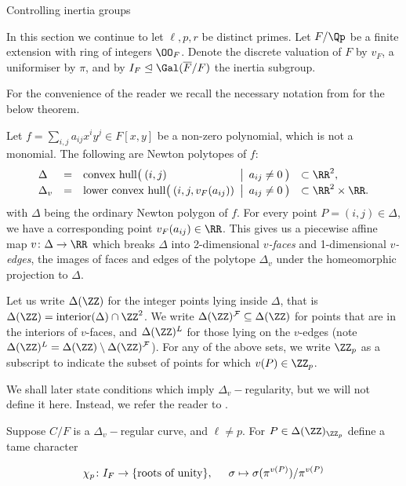 \documentclass[11pt,a4paper]{article}
\newcommand{\Dv}{\Delta_v}
\newcommand{\F}{\mathcal{F}}
\begin{document}
\begin{section}{Controlling inertia groups}
\label{section_inertia}

In this section we continue to let $\ell, p, r$ be distinct primes. Let $F/\Qp$ be a finite extension with ring of integers $\OO_F$.
Denote the discrete valuation of $F$ by $v_F$, a uniformiser by $\pi$, and by $I_F \trianglelefteq \Gal(\overline{F}/F)$ the inertia subgroup. 

For the convenience of the reader we recall the necessary notation from \cite{Models_Curves_DVR} for the below theorem.


Let $f = \sum_{i,j} a_{ij}x^iy^j \in F[x,y]$ be a non-zero polynomial, which is not a monomial.
The following are Newton polytopes of $f$:
$$
\begin{array}{lclrlll}
  \Delta & = & \text{convex hull}\bigl(\>  (i,j) &\bigm|\>a_{ij}\ne 0\>\bigr)  &\subset\RR^2,\\[2pt]
  \Dv    & = & \text{lower convex hull}\bigl(\>  (i,j,v_F(a_{ij}))\!\!\! &\bigm|\>a_{ij}\ne 0\>\bigr)  &\subset\RR^2\times\RR.
\end{array}
$$
with $\Delta$ being the ordinary Newton polygon of $f$. For every point $P = (i,j) \in \Delta$, we have a corresponding point $v_F(a_{ij}) \in \RR$. This gives us a piecewise affine map $v\colon\Delta \rightarrow \RR$ 
which breaks $\Delta$ into 
2-dimensional \emph{$v$-faces} and 1-dimensional \emph{$v$-edges},
the images of faces and edges of the polytope $\Dv$ under the homeomorphic projection to $\Delta$.

Let us write $\Delta(\ZZ)$ for the integer points lying inside $\Delta$, that is
$\Delta(\ZZ)=\text{interior}(\Delta)\cap\ZZ^2$.
We write $\Delta(\ZZ)^\F\subseteq\Delta(\ZZ)$ for points that are in the interiors of $v$-faces,
and $\Delta(\ZZ)^L$ for those lying on the $v$-edges (note $\Delta(\ZZ)^L = \Delta(\ZZ)\setminus\Delta(\ZZ)^\F$). For any of the above sets, we write $\ZZ_p$ as a subscript to indicate the subset of points for which $v(P)\in\ZZ_p$.

We shall later state conditions which imply $\Dv-$regularity, but we will not define it  here. Instead, we refer the reader to \cite[Definition 3.9]{Models_Curves_DVR}.


\begin{theorem}{\cite[Thm 6.4]{Models_Curves_DVR}}
\label{Tim}
Suppose $C/F$ is a $\Delta_v-$regular curve, and $\ell \neq p$. For $P \in \Delta(\ZZ)_{\ZZ_p}$ define a tame character

$$\chi_p\colon I_F \rightarrow \{\text{roots of unity}\}, \hspace{5mm} \sigma \mapsto \sigma(\pi^{v(P)})/{\pi^{v(P)}}$$


\end{theorem}
\end{section}
\end{document}
